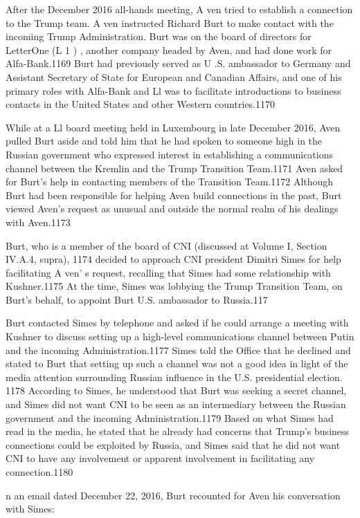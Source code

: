 After the December 2016 all-hands meeting, A ven tried to establish a  connection to the Trump team. A ven instructed Richard Burt to make contact with the incoming Trump Administration. Burt was on the board of directors for LetterOne (L 1 ) , another company headed by Aven, and had done work for Alfa-Bank.1169 Burt had previously served as U .S. ambassador to Germany and Assistant Secretary of State for European and Canadian Affairs, and one of his primary roles with Alfa-Bank and Ll was to facilitate introductions to business contacts in the United States and other Western countries.1170

While at a Ll board meeting held in Luxembourg in late December 2016, Aven pulled Burt aside and told him that he had spoken to someone high in the Russian government who expressed interest in establishing a communications channel between the Kremlin and the Trump Transition Team.1171 Aven asked for Burt's help in contacting members of the Transition Team.1172 Although Burt had been responsible for helping Aven build connections in the past, Burt viewed Aven's request as unusual and outside the normal realm of his dealings with Aven.1173

Burt,  who is a  member of the board of CNI (discussed at Volume I, Section IV.A.4, supra), 1174 decided to approach CNI president Dimitri Simes for help facilitating A ven' s request, recalling that Simes had some relationship with Kushner.1175 At the time, Simes was lobbying the Trump Transition Team, on Burt's behalf, to appoint Burt U.S. ambassador to Russia.117

Burt contacted Simes by telephone and asked if he could arrange a  meeting with Kushner to discuss setting up a  high-level communications channel between Putin and the incoming Administration.1177 Simes told the Office that he declined and stated to Burt that setting up such a channel was not a good idea in light of the media attention surrounding Russian influence in the U.S. presidential election. 1178 According to Simes, he understood that Burt was seeking a  secret channel, and Simes did not want CNI to be seen as an intermediary between the Russian government and the incoming Administration.1179 Based on what Simes had read in the media, he stated that he already had concerns that Trump's business connections could be exploited by Russia, and Simes said that he did not want CNI to have any involvement or apparent involvement in facilitating any connection.1180

n an email dated December 22,  2016, Burt recounted for Aven his conversation with Simes:

